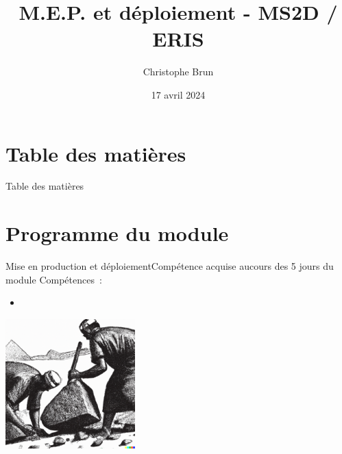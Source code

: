 \documentclass{beamer}
\title{M.E.P. et déploiement - MS2D / ERIS}
\author{Christophe Brun}
\institute{Campus Saint-Michel IT}
\date{17 avril 2024}
\begin{document}
    \begin{frame}
        \titlepage
    \end{frame}


    \section{Table des matières}\label{sec:toc}

    \begin{frame}{Table des matières}
        \tableofcontents
    \end{frame}


    \section{Programme du module}\label{sec:programme-du-module}

    \begin{frame}{Mise en production et déploiement}{Compétence acquise aucours des 5 jours du module}
        Compétences~:
        \begin{itemize}
            \item {}
        \end{itemize}
        \bigbreak
        \centering
        \includegraphics[width=5cm]{image/engraving-of-egyptian-workers-pulling-stones}
    \end{frame}
\end{document}
